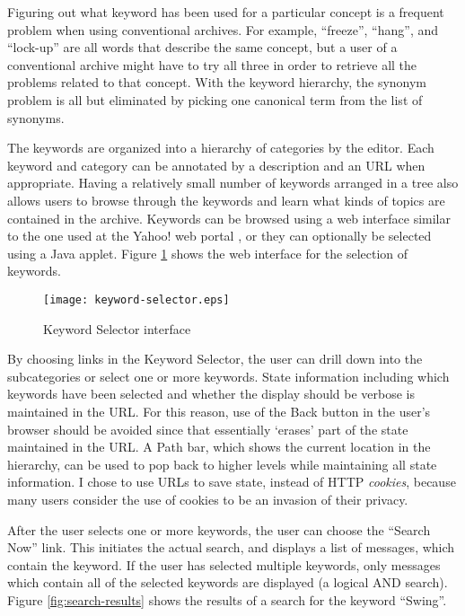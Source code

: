 Figuring out what keyword has been used for a particular concept is a frequent
problem when using conventional archives. For example, ``freeze'', ``hang'',
and ``lock-up'' are all words that describe the same concept, but a user of a
conventional archive might have to try all three in order to retrieve all the
problems related to that concept. With the keyword hierarchy, the synonym
problem is all but eliminated by picking one canonical term from the list of
synonyms.

The keywords are organized into a hierarchy of categories by the editor. Each
keyword and category can be annotated by a description and an URL when
appropriate. Having a relatively small number of keywords arranged in a tree
also allows users to browse through the keywords and learn what kinds of topics
are contained in the archive. Keywords can be browsed using a web interface
similar to the one used at the Yahoo! web portal \cite{yahoo-website}, or they
can optionally be selected using a Java applet. Figure
\ref{fig:keyword-selector} shows the web interface for the selection of
keywords.

\begin{figure}[htbp]
  \centering
  \texttt{[image: keyword-selector.eps]}
  \caption{Keyword Selector interface}
  \label{fig:keyword-selector}
\end{figure}

By choosing links in the Keyword Selector, the user can drill down into the
subcategories or select one or more keywords. State information including which
keywords have been selected and whether the display should be verbose is
maintained in the URL. For this reason, use of the Back button in the user's
browser should be avoided since that essentially `erases' part of the state
maintained in the URL. A Path bar, which shows the current location in the
hierarchy, can be used to pop back to higher levels while maintaining all state
information. I chose to use URLs to save state, instead of HTTP {\em cookies},
because many users consider the use of cookies to be an invasion of their
privacy.

After the user selects one or more keywords, the user can choose the ``Search
Now'' link.  This initiates the actual search, and displays a list of messages,
which contain the keyword. If the user has selected multiple keywords, only
messages which contain all of the selected keywords are displayed (a logical
AND search). Figure \ref{fig:search-results} shows the results of a search for
the keyword ``Swing''.

